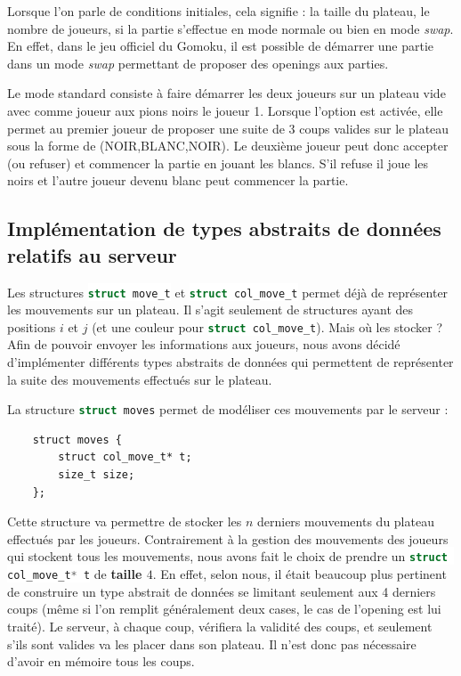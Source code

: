 \documentclass[a4paper,11pt]{article}
\newcommand{\inlinecode}[2]{\colorbox{white}{\lstinline[language=#1]$#2$}}
\begin{document}
Lorsque l'on parle de conditions initiales, cela signifie : la taille du plateau, le nombre de joueurs, si la partie s'effectue en mode normale ou bien en mode \textit{swap}. En effet, dans le jeu officiel du Gomoku, il est possible de démarrer une partie dans un mode \textit{swap} permettant de proposer des openings aux parties.

Le mode standard consiste à faire démarrer les deux joueurs sur un plateau vide avec comme joueur aux pions noirs le joueur 1. Lorsque l'option est activée, elle permet au premier joueur de proposer une suite de 3 coups valides sur le plateau sous la forme de (NOIR,BLANC,NOIR). Le deuxième joueur peut donc accepter (ou refuser) et commencer la partie en jouant les blancs. S'il refuse il joue les noirs et l'autre joueur devenu blanc peut commencer la partie.


\subsection{Implémentation de types abstraits de données relatifs au serveur}
\label{subsct:tad_server}

 Les structures \inlinecode{C}{struct move_t} et \inlinecode{C}{struct col_move_t} permet déjà de représenter les mouvements sur un plateau. Il s'agit seulement de structures ayant des positions $i$ et $j$ (et une couleur pour \inlinecode{C}{struct col_move_t}). Mais où les stocker ?
 Afin de pouvoir envoyer les informations aux joueurs, nous avons décidé d'implémenter différents types abstraits de données qui permettent de représenter la suite des mouvements effectués sur le plateau.

La structure \inlinecode{C}{struct moves} permet de modéliser ces mouvements par le serveur :

\begin{lstlisting}
    struct moves {
        struct col_move_t* t;
        size_t size;
    };
\end{lstlisting}
\label{lst:struct_moves}

Cette structure va permettre de stocker les $n$ derniers mouvements du plateau effectués par les joueurs. Contrairement à la gestion des mouvements des joueurs qui stockent tous les mouvements, nous avons fait le choix de prendre un \inlinecode{C}{struct col_move_t* t} de \textbf{taille $4$}. En effet, selon nous, il était beaucoup plus pertinent de construire un type abstrait de données se limitant seulement aux 4 derniers coups (même si l'on remplit généralement deux cases, le cas de l'opening est lui traité). Le serveur, à chaque coup, vérifiera la validité des coups, et seulement s'ils sont valides va les placer dans son plateau. Il n'est donc pas nécessaire d'avoir en mémoire tous les coups.
\end{document}
